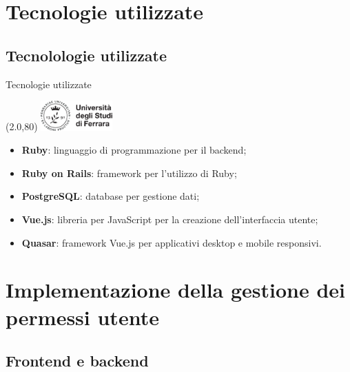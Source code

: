 \documentclass[11pt,xcolor={dvipsnames}]{beamer} %
\newcommand{\MyLogo}{%
\begin{textblock}{14}(2.0,80)
 \includegraphics[height=1.15cm, angle=0]{logo}
\end{textblock}
}
\begin{document}
\section{Tecnologie utilizzate}

\subsection{Tecnolologie utilizzate}

\begin{frame}{Tecnologie utilizzate}
	\transboxin
	\MyLogo
	\begin{itemize}
		\item \textbf{Ruby}: linguaggio di programmazione per il backend;
		\item \textbf{Ruby on Rails}: framework per l'utilizzo di Ruby;
		\item \textbf{PostgreSQL}: database per gestione dati;
		\item \textbf{Vue.js}: libreria per JavaScript per la creazione dell'interfaccia utente;
		\item \textbf{Quasar}: framework Vue.js per applicativi desktop e mobile responsivi.
	\end{itemize}
\end{frame}

\section{Implementazione della gestione dei permessi utente}

\subsection{Frontend e backend}
\end{document}
